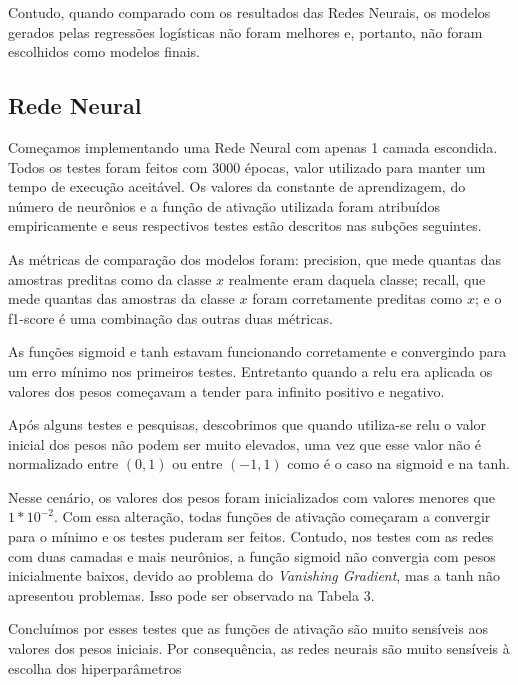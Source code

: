 \documentclass[conference]{IEEEtran}
\begin{document}
	\bigskip
	\bigskip
	\bigskip
	
	Contudo, quando comparado com os resultados das Redes Neurais, os modelos gerados pelas regressões logísticas não foram melhores e, portanto, não foram escolhidos como modelos finais.




\subsection{Rede Neural}

	Começamos implementando uma Rede Neural com apenas 1 camada escondida. Todos os testes foram feitos com 3000 épocas, valor utilizado para manter um tempo de execução aceitável. Os valores da constante de aprendizagem, do número de neurônios e a função de ativação utilizada foram atribuídos empiricamente e seus respectivos testes estão descritos nas subções seguintes.
	
	As métricas de comparação dos modelos foram: precision, que mede quantas das amostras preditas como da classe $x$ realmente eram daquela classe; recall, que mede quantas das amostras da classe $x$ foram corretamente preditas como $x$; e o f1-score é uma combinação das outras duas métricas.
	
	As funções sigmoid e tanh estavam funcionando corretamente e convergindo para um erro mínimo nos primeiros testes. Entretanto quando a relu era aplicada os valores dos pesos começavam a tender para infinito positivo e negativo.
	
	Após alguns testes e pesquisas, descobrimos que quando utiliza-se relu o valor inicial dos pesos não podem ser muito elevados, uma vez que esse valor não é normalizado entre $(0,1)$ ou entre $(-1,1)$ como é o caso na sigmoid e na tanh.
	
	Nesse cenário, os valores dos pesos foram inicializados com valores menores que $1*10^{-2}$. Com essa alteração, todas funções de ativação começaram a convergir para o mínimo e os testes puderam ser feitos. Contudo, nos testes com as redes com duas camadas e mais neurônios, a função sigmoid não convergia com pesos inicialmente baixos, devido ao problema do \textit{Vanishing Gradient}, mas a tanh não apresentou problemas. Isso pode ser observado na Tabela 3.
	
	Concluímos por esses testes que as funções de ativação são muito sensíveis aos valores dos pesos iniciais. Por consequência, as redes neurais são muito sensíveis à escolha dos hiperparâmetros
\end{document}
